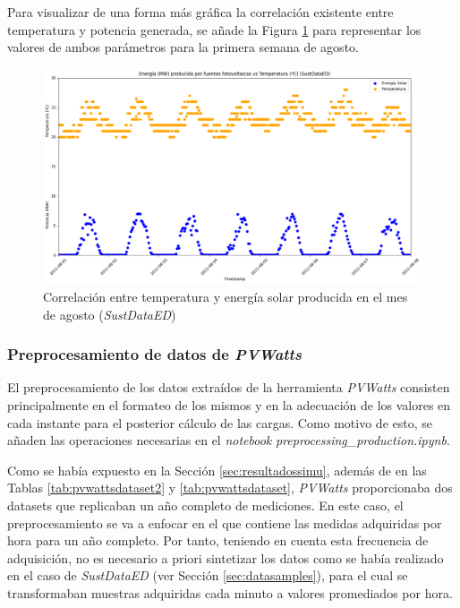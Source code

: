 \vspace{3mm}

Para visualizar de una forma más gráfica la correlación existente entre temperatura y potencia generada, se añade la Figura \ref{fig:energiavstemp} para representar los valores de ambos parámetros para la primera semana de agosto.

\vspace{3mm}

\begin{figure}[h!]
  \centering
  \includegraphics[width=1\textwidth]{img/diseno/energiavstemp.png}
  \caption{Correlación entre temperatura y energía solar producida en el mes de agosto (\textit{SustDataED})}
  \label{fig:energiavstemp}
\end{figure}

\subsubsection{Preprocesamiento de datos de \textit{PVWatts}}
\label{sec:preprocpvwatts}

El preprocesamiento de los datos extraídos de la herramienta \textit{PVWatts} consisten principalmente en el formateo de los mismos y en la adecuación de los valores en cada instante para el posterior cálculo de las cargas. Como motivo de esto, se añaden las operaciones necesarias en el \textit{notebook} \textit{preprocessing\_production.ipynb}. 

\vspace{3mm}

Como se había expuesto en la Sección \ref{sec:resultadossimu}, además de en las Tablas \ref{tab:pvwattsdataset2} y \ref{tab:pvwattsdataset}, \textit{PVWatts} proporcionaba dos datasets que replicaban un año completo de mediciones. En este caso, el preprocesamiento se va a enfocar en el que contiene las medidas adquiridas por hora para un año completo. Por tanto, teniendo en cuenta esta frecuencia de adquisición, no es necesario a priori sintetizar los datos como se había realizado en el caso de \textit{SustDataED} (ver Sección \ref{sec:datasamples}), para el cual se transformaban muestras adquiridas cada minuto a valores promediados por hora.

